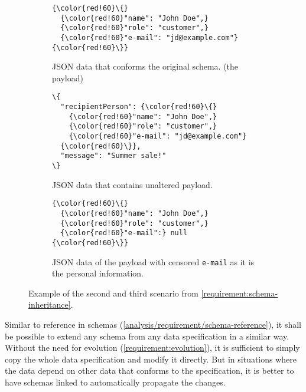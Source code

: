 \begin{figure}[h!]\centering
  \begin{subfigure}{\textwidth}
  \begin{Verbatim}[commandchars=\\\{\}]
{\color{red!60}\{}
  {\color{red!60}"name": "John Doe",}
  {\color{red!60}"role": "customer",}
  {\color{red!60}"e-mail": "jd@example.com"}
{\color{red!60}\}}
    \end{Verbatim}
    \caption{JSON data that conforms the original schema. (the payload)}
  \end{subfigure}


  \begin{subfigure}[b]{.45\textwidth}

    \begin{Verbatim}[commandchars=\\\{\}]
\{
  "recipientPerson": {\color{red!60}\{}
    {\color{red!60}"name": "John Doe",}
    {\color{red!60}"role": "customer",}
    {\color{red!60}"e-mail": "jd@example.com"}
  {\color{red!60}\}},
  "message": "Summer sale!"
\}
    \end{Verbatim}
    \caption{JSON data that contains unaltered payload.}
    \label{fig:schema-inheritance:json-data-unaltered}
  \end{subfigure}\hfill%
  \begin{subfigure}[b]{.45\textwidth}
    \begin{Verbatim}[commandchars=\\\{\}]
{\color{red!60}\{}
  {\color{red!60}"name": "John Doe",}
  {\color{red!60}"role": "customer",}
  {\color{red!60}"e-mail":} null
{\color{red!60}\}}
    \end{Verbatim}
    \caption{JSON data of the payload with censored {\tt e-mail} as it is the personal information.}
    \label{fig:schema-inheritance:json-data-censored}
    \end{subfigure}%
  \caption{Example of the second and third scenario from \autoref{requirement:schema-inheritance}.}
\end{figure}

Similar to reference in schemas (\autoref{analysis/requirement/schema-reference}), it shall be possible to extend any schema from any data specification in a similar way. Without the need for evolution (\autoref{requirement:evolution}), it is sufficient to simply copy the whole data specification and modify it directly. But in situations where the data depend on other data that conforms to the specification, it is better to have schemas linked to automatically propagate the changes.

